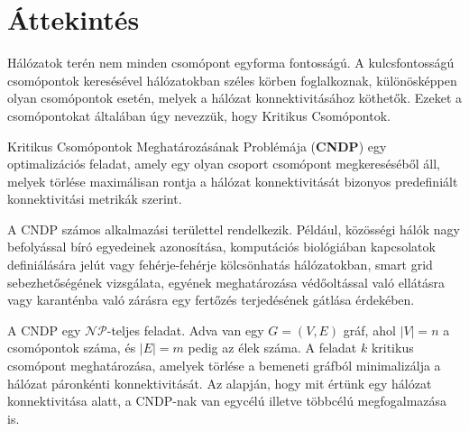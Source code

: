 \section{Áttekintés}\label{sec:ATTEKINTES}

Hálózatok terén nem minden csomópont egyforma fontosságú.
A kulcsfontosságú csomópontok keresésével hálózatokban széles körben foglalkoznak,
különösképpen olyan csomópontok esetén, melyek a hálózat konnektivitásához köthetők.
Ezeket a csomópontokat általában úgy nevezzük, hogy Kritikus Csomópontok.

Kritikus Csomópontok Meghatározásának Problémája (\textbf{CNDP})
egy optimalizációs feladat, amely egy olyan csoport csomópont
megkereséséből áll, melyek törlése maximálisan rontja a hálózat
konnektivitását bizonyos predefiniált konnektivitási metrikák szerint.

A CNDP számos alkalmazási területtel rendelkezik.
Például, közösségi hálók nagy befolyással bíró egyedeinek azonosítása,
komputációs biológiában kapcsolatok definiálására jelút
vagy fehérje-fehérje kölcsönhatás hálózatokban,
smart grid sebezhetőségének vizsgálata, egyének meghatározása
védőoltással való ellátásra vagy karanténba való zárásra egy
fertőzés terjedésének gátlása érdekében.

A CNDP egy $\mathcal{N}\mathcal{P}$-teljes feladat. Adva van egy $G = (V, E)$ gráf, ahol $|V| = n$ a csomópontok száma,
és $|E| = m$ pedig az élek száma. A feladat $k$ kritikus csomópont meghatározása, amelyek törlése a bemeneti
gráfból minimalizálja a hálózat páronkénti konnektivitását. Az alapján, hogy mit értünk egy hálózat
konnektivitása alatt, a CNDP-nak van egycélú illetve többcélú megfogalmazása is.
